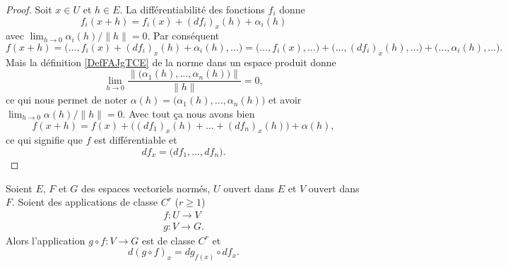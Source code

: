 \begin{proof}
    Soit \( x\in U\) et \( h\in E\). La différentiabilité des fonctions \( f_i\) donne
    \begin{equation}
        f_i(x+h)=f_i(x)+(df_i)_x(h)+\alpha_i(h)
    \end{equation}
    avec \( \lim_{h\to 0} \alpha_i(h)/\| h \|=0\). Par conséquent
    \begin{equation}
        f(x+h)=\big( \ldots, f_i(x)+(df_i)_x(h)+\alpha_i(h),\ldots \big)= \big( \ldots,f_i(x),\ldots \big)+ \big( \ldots,(df_i)_x(h),\ldots \big)+ \big( \ldots,\alpha_i(h),\ldots \big).
    \end{equation}
    Mais la définition \ref{DefFAJgTCE} de la norme dans un espace produit donne
    \begin{equation}
        \lim_{h\to 0} \frac{ \| \big( \alpha_1(h),\ldots, \alpha_n(h) \big) \| }{ \| h \| }=0,
    \end{equation}
    ce qui nous permet de noter \( \alpha(h)=\big( \alpha_1(h),\ldots, \alpha_n(h) \big)\) et avoir \( \lim_{h\to 0} \alpha(h)/\| h \|=0\). Avec tout ça nous avons bien
    \begin{equation}
        f(x+h)=f(x)+\big( (df_1)_x(h)+\ldots +(df_n)_x(h) \big)+\alpha(h),
    \end{equation}
    ce qui signifie que \( f\) est différentiable et
    \begin{equation}
        df_x=\big( df_1,\ldots, df_n \big).
    \end{equation}
\end{proof}

\begin{theorem}
    Soient \( E\), \( F\) et \( G\) des espaces vectoriels normés, \( U\) ouvert dans \( E\) et \( V\) ouvert dans \( F\). Soient des applications de classe \( C^r\) (\( r\geq 1\))
    \begin{subequations}
        \begin{align}
            f\colon U\to V\\
            g\colon V\to G.
        \end{align}
    \end{subequations}
    Alors l'application \( g\circ f\colon V\to G\) est de classe \( C^r\) et
    \begin{equation}\label{EqHFmezmr}
        d(g\circ f)_x=dg_{f(x)}\circ df_x.
    \end{equation}
\end{theorem}

